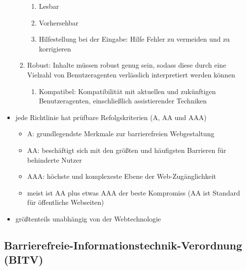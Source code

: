 \documentclass[paper=a4, fontsize=11pt]{scrartcl} %
\numberwithin{equation}{section} %
\numberwithin{figure}{section} %
\numberwithin{table}{section} %
\begin{document}
\begin{itemize}
\begin{enumerate}[label*=\arabic*.]
\begin{enumerate}[label*=\arabic*.]
\item Lesbar
\item Vorhersehbar
\item Hilfestellung bei der Eingabe: Hilfe Fehler zu vermeiden und zu korrigieren
\end{enumerate}
\item Robust: Inhalte müssen robust genug sein, sodass diese durch eine Vielzahl von Benutzeragenten verlässlich interpretiert werden können
\begin{enumerate}[label*=\arabic*.]
\item Kompatibel: Kompatibilität mit aktuellen und zukünftigen Benutzeragenten, einschließlich assistierender Techniken
\end{enumerate}
\end{enumerate}
\item jede Richtlinie hat prüfbare Refolgskriterien (A, AA und AAA)
\begin{itemize}
\item A: grundlegendste Merkmale zur barrierefreien Webgestaltung
\item AA: beschäftigt sich mit den größten und häufigsten Barrieren für behinderte Nutzer
\item AAA: höchste und komplexeste Ebene der Web-Zugänglichkeit
\item meist ist AA plus etwas AAA der beste Kompromiss (AA ist Standard für öffentliche Webseiten)
\end{itemize}
\item größtenteils unabhängig von der Webtechnologie
\end{itemize}

\subsection{Barrierefreie-Informationstechnik-Verordnung (BITV)}
\end{document}
